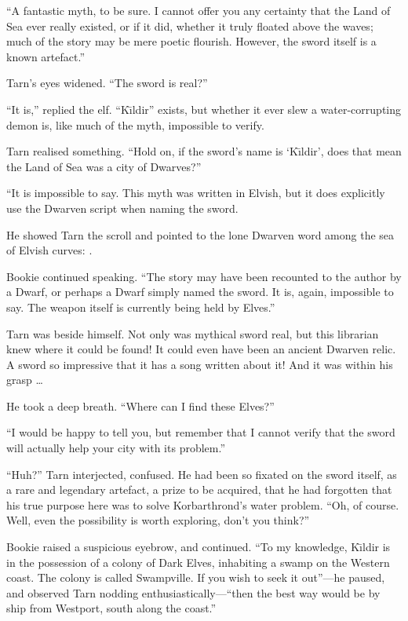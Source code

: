 ``A fantastic myth, to be sure.  I cannot offer you any certainty that the Land of Sea ever really existed, or if it did, whether it truly floated above the waves; much of the story may be mere poetic flourish.  However, the sword itself is a known artefact.''

Tarn's eyes widened.  ``The sword is real?''

``It is,'' replied the elf.  ``K\=\i{}ldir'' exists, but whether it ever slew a water-corrupting demon is, like much of the myth, impossible to verify.

Tarn realised something.  ``Hold on, if the sword's name is `K\=\i{}ldir', does that mean the Land of Sea was a city of Dwarves?''

``It is impossible to say.  This myth was written in Elvish, but it does explicitly use the Dwarven script when naming the sword.

He showed Tarn the scroll and pointed to the lone Dwarven word among the sea of Elvish curves: .

Bookie continued speaking.  ``The story may have been recounted to the author by a Dwarf, or perhaps a Dwarf simply named the sword.  It is, again, impossible to say.  The weapon itself is currently being held by Elves.''

Tarn was beside himself.  Not only was mythical sword real, but this librarian knew where it could be found!  It could even have been an ancient Dwarven relic.  A sword so impressive that it has a song written about it!  And it was within his grasp \ldots{}

He took a deep breath.  ``Where can I find these Elves?''

``I would be happy to tell you, but remember that I cannot verify that the sword will actually help your city with its problem.''

``Huh?'' Tarn interjected, confused.  He had been so fixated on the sword itself, as a rare and legendary artefact, a prize to be acquired, that he had forgotten that his true purpose here was to solve Korbarthrond's water problem.  ``Oh, of course.  Well, even the possibility is worth exploring, don't you think?''

Bookie raised a suspicious eyebrow, and continued.  ``To my knowledge, K\=\i{}ldir is in the possession of a colony of Dark Elves, inhabiting a swamp on the Western coast.  The colony is called Swampville.  If you wish to seek it out''---he paused, and observed Tarn nodding enthusiastically---``then the best way would be by ship from Westport, south along the coast.''

